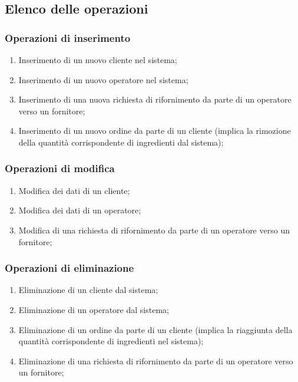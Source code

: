 \documentclass[12pt,a4paper]{article}
\begin{document}
    \subsection{Elenco delle operazioni}
    \subsubsection{Operazioni di inserimento}
    \begin{enumerate}[leftmargin=2.8em,label=\textbf{Op.\arabic*}]
        \item Inserimento di un nuovo cliente nel sistema;
        \item Inserimento di un nuovo operatore nel sistema;
        \item Inserimento di una nuova richiesta di rifornimento da parte di un operatore verso un fornitore;
        \item Inserimento di un nuovo ordine da parte di un cliente (implica la rimozione della quantità corrispondente di ingredienti dal sistema);
    \end{enumerate}

    \subsubsection{Operazioni di modifica}
    \begin{enumerate}[leftmargin=2.8em,label=\textbf{Op.\arabic*}]
        \item Modifica dei dati di un cliente;
        \item Modifica dei dati di un operatore;
        \item Modifica di una richiesta di rifornimento da parte di un operatore verso un fornitore;
    \end{enumerate}

    \subsubsection{Operazioni di eliminazione}
    \begin{enumerate}[leftmargin=2.8em,label=\textbf{Op.\arabic*}]
        \item Eliminazione di un cliente dal sistema;
        \item Eliminazione di un operatore dal sistema;
        \item Eliminazione di un ordine da parte di un cliente (implica la riaggiunta della quantità corrispondente di ingredienti nel sistema);
        \item Eliminazione di una richiesta di rifornimento da parte di un operatore verso un fornitore;
    \end{enumerate}
\end{document}
